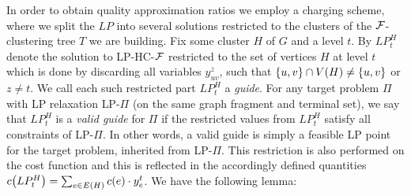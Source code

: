 In order to obtain quality approximation ratios we employ a charging scheme, where we split the $LP$ into several solutions restricted to the clusters of the $\mathcal{F}$-clustering tree $T$ we are building. Fix some cluster $H$ of $G$ and a level $t$. By $LP_t^H$ denote the solution to \textsc{LP-HC-$\mathcal{F}$} restricted to the set of vertices $H$ at level $t$ which is done by discarding all variables $y_{uv}^z$, such that $\mathopen{}\left\{ u,v \right\}\cap V\mathopen{}\left( H \right)\neq \mathopen{}\left\{ u,v \right\}$ or $z\neq t$. We call each such restricted part $LP_t^H$ a \emph{guide}. For any target problem $\Pi$ with LP relaxation \textsc{LP-$\Pi$} (on the same graph fragment and terminal set), we say that $LP_t^H$ is a \emph{valid guide} for $\Pi$ if the restricted values from $LP_t^H$ satisfy all constraints of \textsc{LP-$\Pi$}. In other words, a valid guide is simply a feasible LP point for the target problem, inherited from \textsc{LP-$\Pi$}. This restriction is also performed on the cost function and this is reflected in the accordingly defined quantities ${c}\mathopen{}\left( LP_t^H \right) = \sum_{e\in E\mathopen{}\left( H \right)} c\mathopen{}\left( e \right) \cdot y_{e}^t$. We have the following lemma:


